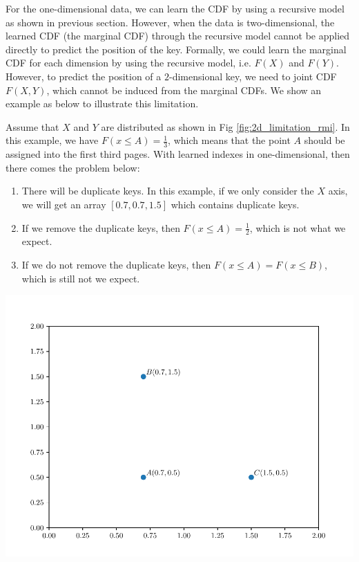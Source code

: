For the one-dimensional data, we can learn the CDF by using a recursive model as shown in previous section. However, when the data is two-dimensional, the learned CDF (the marginal CDF) through the recursive model cannot be applied directly to predict the position of the key. Formally, we could learn the marginal CDF for each dimension by using the recursive model, i.e. $F(X)$ and $F(Y)$. However, to predict the position of a $2$-dimensional key, we need to joint CDF $F(X,Y)$, which cannot be induced from the marginal CDFs. We show an example as below to illustrate this limitation.

\begin{mscexample}
	Assume that $X$ and $Y$ are distributed as shown in Fig \ref{fig:2d_limitation_rmi}. In this example, we have $F(x\leq A)=\frac{1}{3}$, which means that the point $A$ should be assigned into the first third pages. With learned indexes in one-dimensional, then there comes the problem below:
	
	\begin{enumerate}
		\item There will be duplicate keys. In this example, if we only consider the $X$ axis, we will get an array $[0.7, 0.7, 1.5]$ which contains duplicate keys. 
		\item If we remove the duplicate keys, then $F(x\leq A)=\frac{1}{2}$, which is not what we expect.
		\item If we do not remove the duplicate keys, then $F(x\leq A)=F(x\leq B)$, which is still not we expect.
	\end{enumerate}
	

		\centering
		\includegraphics[scale=0.5]{graphs/implementation/2d/2d_rmi_limitation}
		\label{fig:2d_limitation_rmi}

	
\end{mscexample}


